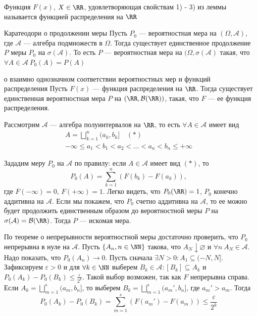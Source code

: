 \begin{defn}{}{}
    Функция \( F(x) \), \( X \in \RR \),
    удовлетворяющая свойствам 1) - 3) из леммы называется функцией распределения на \( \RR \)
\end{defn}

\begin{thrm}{Каратеодори о продолжении меры}{}
    Пусть \( P_0 \) --- вероятностная мера на \( (\Omega, \mathcal{A}) \),
    где \( \mathcal{A} \) --- алгебра подмножеств в \( \Omega \).
    Тогда существует единственное продолжение \( P \) меры \( P_0 \) на \( \sigma(\mathcal{A}) \).
    То есть \( P \) --- вероятностная мера на \( (\Omega, \sigma(\mathcal{A}) \) такая,
    что \( \forall A \in \mathcal{A} \ P_0(A) = P(A) \)
\end{thrm}

\begin{thrm}{о взаимно однозначном соответствии вероятностных мер и функций распределения}{}
    Пусть \( F(x) \) --- функция распределения на \( \RR \).
    Тогда существует единственная вероятностная мера \( P \) на \( (\RR, \mathcal{B}(\RR)) \),
    такая, что \( F \) --- ее функция распределения.
\end{thrm}

Рассмотрим \( \mathcal{A} \) --- алгебра полуинтервалов на \( \RR \),
то есть \( \forall A \in \mathcal{A} \) имеет вид
\begin{gather*}
    A = \bigsqcup\limits_{k = 1}^{n} (a_k, b_k] \quad (\ast)
    \\
    -\infty \leq a_1 < b_1 < a_2 < \ldots < a_n < b_n \leq +\infty
\end{gather*}

Зададим меру \( P_0 \) на \( \mathcal{A} \) по правилу:
если \( A \in \mathcal{A} \) имеет вид \( ( \ast ) \), то
\[
    P_0 (A) = \sum\limits_{k = 1}^{n} ( F(b_k) - F(a_k) ),
\]
где \( F (-\infty) = 0 \), \( F(+\infty) = 1 \).
Легко видеть, что \( P_0 (\RR) = 1 \),
\( P_0 \) конечно аддитивна на \( \mathcal{A} \).
Если мы покажем,
что \( P_0 \) счетно аддитивна на \( \mathcal{A} \),
то ее можно будет продолжить единственным образом до вероятностной меры \( P \)
на \( \sigma(\mathcal{A}) = \mathcal{B}(\RR) \).
Тогда \( P \) --- искомая мера.

По теореме о непрерывности вероятностной меры достаточно проверить,
что \( P_0 \) непрерывна в нуле на \( \mathcal{A} \).
Пусть \( \{ A_n, n \in \NN \} \) такова,
что \( A_N \downarrow \varnothing \) и \( \forall n \ A_N \in \mathcal{A} \).
Надо показать, что \( P_0 (A_n) \to 0 \).
Пусть сначала \( \exists N > 0 : A_1 \subseteq (-N, N] \).
Зафиксируем \( \varepsilon > 0 \) и для \( \forall k \in \NN \)
выберем \( B_k \in \mathcal{A} : [B_k] \subseteq A_k \)
и \( P_0 (A_k) - P_0 (B_k) \leq \frac{\varepsilon}{2^k} \).
Такой выбор возможен, так как \( F \) непрерывна справа.
Если
\(
    A_k = \bigsqcup\limits_{m = 1}^{s} ( a_m, b_n ]
\), то выберем
\(
    B_k = \bigsqcup\limits_{m = 1}^{s} ( a_m', b_n ]
\), где \( a_m' > a_m \).
Тогда
\[
    P_0 (A_k) - P_0(B_k) = \sum\limits_{m = 1}^{s} ( F(a_m') - F(a_m) ) \leq \frac{\varepsilon}{2^k}
\]
